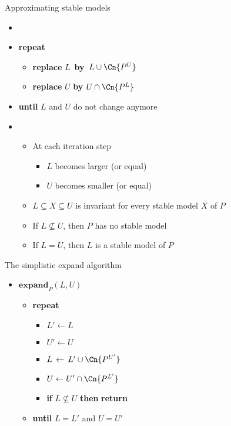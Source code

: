 \begin{frame}{Approximating stable models}
  \begin{itemize}
  \item {} \
    \smallskip
  \item []\textbf{repeat}
    \begin{itemize}\normalsize
    \item[] \textbf{replace} $L$\, \textbf{by}\, $L\cup\Cn{P^U}$
    \item[] \textbf{replace} $U$   \textbf{by}   $U\cap\Cn{P^L}$
    \end{itemize}
  \item [] \textbf{until} $L$ and $U$ do not change anymore
    \smallskip
  \item<2->  \
    \begin{itemize}\normalsize
    \item At each iteration step
      \begin{itemize}\normalsize
      \item $L$ becomes larger  (or equal)
      \item $U$ becomes smaller (or equal)
      \end{itemize}
    \item $L\subseteq X\subseteq U$ is invariant for every stable model $X$ of $P$
      \medskip
    \item<3-> If $L\not\subseteq U$, then $P$ has no stable model
    \item<4-> If $L=U$, then $L$ is a stable model of $P$
    \end{itemize}
  \end{itemize}
\end{frame}
\begin{frame}{The simplistic expand algorithm}
  \bigskip
  \begin{itemize}
  \item[] $\mathbf{expand}_{P}(L,U)$ \
    \begin{itemize}\normalsize
    \item[] \textbf{repeat} \
      \begin{itemize}\normalsize
      \item [] $L'\leftarrow L$
      \item [] $U'\leftarrow U$
        \smallskip
      \item [] $L\,\leftarrow\,L'\cup\Cn{P^{U'}}$
      \item [] $U  \leftarrow  U'\cap\Cn{P^{L'}}$
        \smallskip
      \item [] \textbf{if} $L\not\subseteq U$ \textbf{then} \textbf{return}
        \smallskip
      \end{itemize}
    \item[]\textbf{until} $L=L'$ and $U=U'$
    \end{itemize}
  \end{itemize}
\end{frame}
